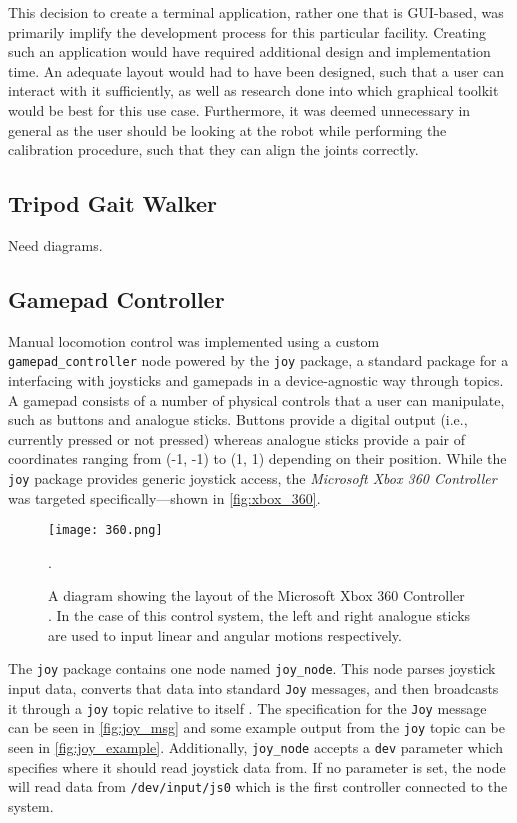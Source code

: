 This decision to create a terminal application, rather one that is GUI-based, was primarily  implify the development process for this particular facility. Creating such an application would have required additional design and implementation time. An adequate layout would had to have been designed, such that a user can interact with it sufficiently, as well as research done into which graphical toolkit would be best for this use case. Furthermore, it was deemed unnecessary in general as the user should be looking at the robot while performing the calibration procedure, such that they can align the joints correctly.

\subsection{Tripod Gait Walker}

Need diagrams.

\subsection{Gamepad Controller}

Manual locomotion control was implemented using a custom \texttt{gamepad\_controller} node powered by the \texttt{joy} package, a standard package for a interfacing with joysticks and gamepads in a device-agnostic way through topics. A gamepad consists of a number of physical controls that a user can manipulate, such as buttons and analogue sticks. Buttons provide a digital output (i.e., currently pressed or not pressed) whereas analogue sticks provide a pair of coordinates ranging from (-1, -1) to (1, 1) depending on their position. While the \texttt{joy} package provides generic joystick access, the \emph{Microsoft Xbox 360 Controller} was targeted specifically---shown in \autoref{fig:xbox_360}.

\begin{figure}[!h]
	\centering
	\texttt{[image: 360.png]}
	\caption{A diagram showing the layout of the Microsoft Xbox 360 Controller \cite{360_controller}. In the case of this control system, the left and right analogue sticks are used to input linear and angular motions respectively.}.
	\label{fig:xbox_360}
\end{figure}

The \texttt{joy} package contains one node named \texttt{joy\_node}. This node parses joystick input data, converts that data into standard \texttt{Joy} messages, and then broadcasts it through a \texttt{joy} topic relative to itself \cite{ros_wiki_joy}. The specification for the \texttt{Joy} message can be seen in \autoref{fig:joy_msg} and some example output from the \texttt{joy} topic can be seen in \autoref{fig:joy_example}. Additionally, \texttt{joy\_node} accepts a \texttt{dev} parameter which specifies where it should read joystick data from. If no parameter is set, the node will read data from \texttt{/dev/input/js0} which is the first controller connected to the system. 

